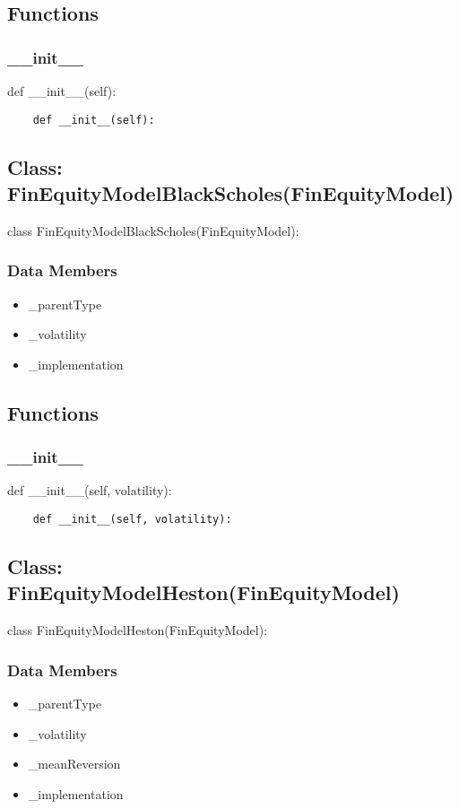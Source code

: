 \documentclass[twoside,11pt]{book}
\begin{document}
\subsection*{Functions}

\subsubsection*{{\bf \_\_init\_\_}}
def \_\_init\_\_(self): 

\begin{lstlisting}
    def __init__(self):
\end{lstlisting}

\subsection*{Class: FinEquityModelBlackScholes(FinEquityModel)}
class FinEquityModelBlackScholes(FinEquityModel): 

\subsubsection*{Data Members}
\begin{itemize}
\item{\_parentType}
\item{\_volatility}
\item{\_implementation}
\end{itemize}

\subsection*{Functions}

\subsubsection*{{\bf \_\_init\_\_}}
def \_\_init\_\_(self, volatility): 

\begin{lstlisting}
    def __init__(self, volatility):
\end{lstlisting}

\subsection*{Class: FinEquityModelHeston(FinEquityModel)}
class FinEquityModelHeston(FinEquityModel): 

\subsubsection*{Data Members}
\begin{itemize}
\item{\_parentType}
\item{\_volatility}
\item{\_meanReversion}
\item{\_implementation}
\end{itemize}
\end{document}
